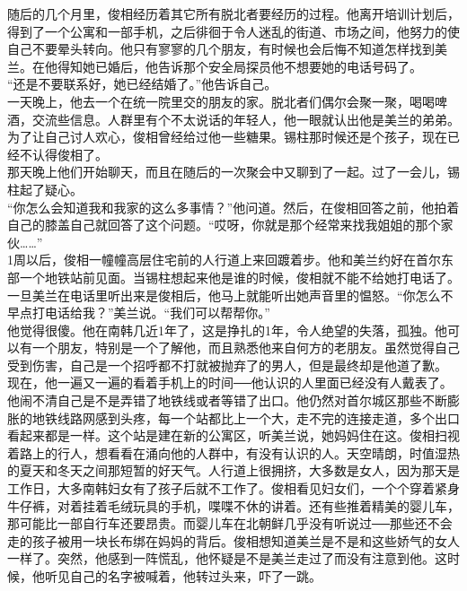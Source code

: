随后的几个月里，俊相经历着其它所有脱北者要经历的过程。他离开培训计划后，得到了一个公寓和一部手机，之后徘徊于令人迷乱的街道、市场之间，他努力的使自己不要晕头转向。他只有寥寥的几个朋友，有时候也会后悔不知道怎样找到美兰。在他得知她已婚后，他告诉那个安全局探员他不想要她的电话号码了。\\

“还是不要联系好，她已经结婚了。”他告诉自己。\\

一天晚上，他去一个在统一院里交的朋友的家。脱北者们偶尔会聚一聚，喝喝啤酒，交流些信息。人群里有个不太说话的年轻人，他一眼就认出他是美兰的弟弟。为了让自己讨人欢心，俊相曾经给过他一些糖果。锡柱那时候还是个孩子，现在已经不认得俊相了。\\

那天晚上他们开始聊天，而且在随后的一次聚会中又聊到了一起。过了一会儿，锡柱起了疑心。\\

“你怎么会知道我和我家的这么多事情？”他问道。然后，在俊相回答之前，他拍着自己的膝盖自己就回答了这个问题。“哎呀，你就是那个经常来找我姐姐的那个家伙……”\\

1周以后，俊相一幢幢高层住宅前的人行道上来回踱着步。他和美兰约好在首尔东部一个地铁站前见面。当锡柱想起来他是谁的时候，俊相就不能不给她打电话了。一旦美兰在电话里听出来是俊相后，他马上就能听出她声音里的愠怒。“你怎么不早点打电话给我？”美兰说。“我们可以帮帮你。”\\

他觉得很傻。他在南韩几近1年了，这是挣扎的1年，令人绝望的失落，孤独。他可以有一个朋友，特别是一个了解他，而且熟悉他来自何方的老朋友。虽然觉得自己受到伤害，自己是一个招呼都不打就被抛弃了的男人，但是最终却是他道了歉。\\

现在，他一遍又一遍的看着手机上的时间──他认识的人里面已经没有人戴表了。他闹不清自己是不是弄错了地铁线或者等错了出口。他仍然对首尔城区那些不断膨胀的地铁线路网感到头疼，每一个站都比上一个大，走不完的连接走道，多个出口看起来都是一样。这个站是建在新的公寓区，听美兰说，她妈妈住在这。俊相扫视着路上的行人，想看看在涌向他的人群中，有没有认识的人。天空晴朗，时值湿热的夏天和冬天之间那短暂的好天气。人行道上很拥挤，大多数是女人，因为那天是工作日，大多南韩妇女有了孩子后就不工作了。俊相看见妇女们，一个个穿着紧身牛仔裤，对着挂着毛绒玩具的手机，喋喋不休的讲着。还有些推着精美的婴儿车，那可能比一部自行车还要昂贵。而婴儿车在北朝鲜几乎没有听说过──那些还不会走的孩子被用一块长布绑在妈妈的背后。俊相想知道美兰是不是和这些娇气的女人一样了。突然，他感到一阵慌乱，他怀疑是不是美兰走过了而没有注意到他。这时候，他听见自己的名字被喊着，他转过头来，吓了一跳。\\

